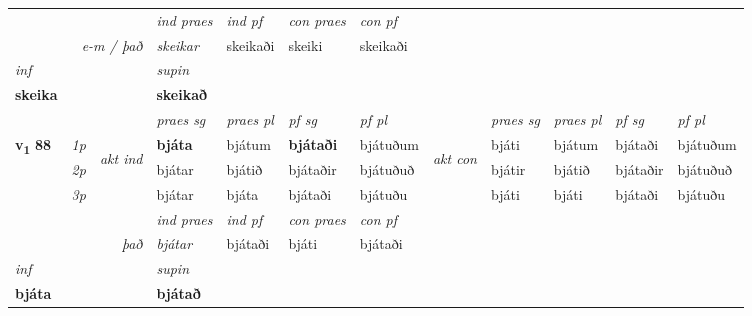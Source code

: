 \begin{longtable}[l]{X>{\footnotesize\itshape}llXXXXlXXXX}
   && &  \textit{ind praes} & \textit{ind pf} & \textit{con praes} & \textit{con pf} \\*
\multicolumn{3}{r}{\textit{e-m / það}} & skeikar & skeikaði & skeiki & skeikaði \\*

\cmidrule{4-7}
   {\textit{inf}} & &      & \textit{supin}   \\*
  {\textbf{skeika}} & &      &  \textbf{skeikað}   \\*

\midrule

 & &   & \textit{praes sg}  & \textit{praes pl}    & \textit{ pf sg} & \textit{pf pl} & & \textit{praes sg}  & \textit{praes pl}    & \textit{pf sg} & \textit{pf pl }  \\ \cmidrule{4-7} \cmidrule{9-12}
 \multirow{2}{*}{{{\textbf{v{\textsubscript{1}}} \Large{\textbf{88}}}}}  & 1p & \multirow{3}{*}{\begin{turn}{90}\textit{akt ind}\end{turn}} & \textbf{bjáta} & bjátum & \textbf{bjátaði} & bjátuðum & \multirow{3}{*}{\begin{turn}{90}\textit{akt con}\end{turn}} &bjáti & bjátum & bjátaði & bjátuðum\\*
 & 2p &  &  bjátar  & bjátið & bjátaðir & bjátuðuð & & bjátir & bjátið & bjátaðir & bjátuðuð \\*
 & 3p &  & bjátar & bjáta & bjátaði & bjátuðu & & bjáti & bjáti& bjátaði & bjátuðu \\*
\cmidrule{4-7} \cmidrule{9-12}

   && &  \textit{ind praes} & \textit{ind pf} & \textit{con praes} & \textit{con pf} \\*
\multicolumn{3}{r}{\textit{það}} & bjátar & bjátaði & bjáti & bjátaði \\*

\cmidrule{4-7}
   {\textit{inf}} & &      & \textit{supin}   \\*
  {\textbf{bjáta}} & &      &  \textbf{bjátað}   \\*

\midrule


\end{longtable}
